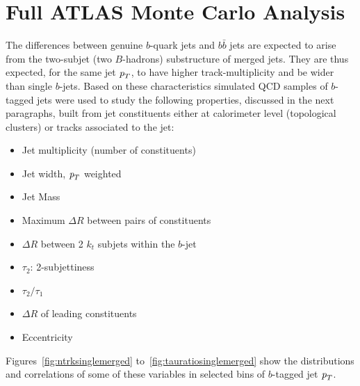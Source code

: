 \section{Full ATLAS Monte Carlo Analysis}\label{sec:gbbKine}



The differences between genuine $b$-quark jets and $b \bar{b}$ jets are expected to arise from the two-subjet (two $B$-hadrons) substructure of merged jets.  They are thus expected, for the same jet ${\emph{p}_{T}}$, to have higher track-multiplicity and be wider than single $b$-jets. Based on these characteristics %
simulated QCD samples of $b$-tagged jets were used to study the following properties, discussed in the next paragraphs, built from jet constituents either at calorimeter level (topological clusters) or tracks associated to the jet:

\begin{itemize}\addtolength{\itemsep}{-0.4\baselineskip}
\item
Jet multiplicity (number of constituents)
\item
Jet width, ${\emph{p}_{T}}$ weighted %
\item 
Jet Mass
\item
Maximum $\Delta R$ between pairs of constituents %
\item
$\Delta R$ between 2 $k_t$ subjets within the $b$-jet
\item
$\tau_2$: 2-subjettiness 
\item
$\tau_2/\tau_1$
\item
$\Delta R$ of leading constituents %
\item 
Eccentricity %
\end{itemize}




Figures~\ref{fig:ntrksinglemerged} to~\ref{fig:tauratiosinglemerged} show the distributions and correlations of some of these variables in selected bins of $b$-tagged jet ${\emph{p}_{T}}$. 

